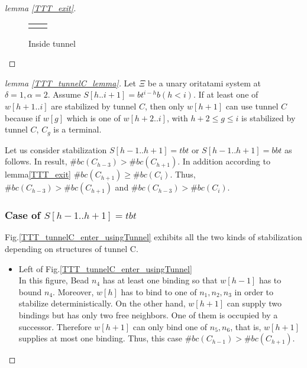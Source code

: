 \documentclass[runningheads]{llncs}
\begin{document}
\begin{proof}[lemma \ref{TTT_exit}]
\begin{figure}
\begin{tabular}{cc}
\begin{minipage}{0.33\hsize}
    \caption{Inside tunnel}
    \label{TTT_inside_tunnel}
    \end{minipage}
 
    \end{tabular}
\end{figure}
\end{proof}

\begin{proof}[lemma \ref{TTT_tunnelC_lemma}]
Let $\Xi$ be a unary oritatami system at $\delta = 1, \alpha = 2$.
Assume $S[h..i+1] = bt^{i-h}b (h<i)$. If at least one of $w[h+1..i]$ are stabilized by tunnel $C$, then only $w[h+1]$ can use tunnel $C$ because if $w[g]$ which is one of $w[h+2..i]$, with $h+2 \leq g \leq i$ is stabilized by tunnel $C$, $C_g$ is a terminal.


Let us consider stabilization $S[h-1..h+1] = tbt$ or $S[h-1..h+1] = bbt$ as follows. In result, $\#bc(C_{h-3}) > \#bc(C_{h+1})$. In addition according to lemma\ref{TTT_exit} $\#bc(C_{h+1}) \geq \#bc(C_{i})$. Thus, $\#bc(C_{h-3}) > \#bc(C_{h+1})$ and $\#bc(C_{h-3}) > \#bc(C_{i})$.
\\

\subsubsection{Case of $S[h-1..h+1] = tbt$}
Fig.\ref{TTT_tunnelC_enter_usingTunnel} exhibits all the two kinds of stabilization depending on structures of tunnel C.

\begin{itemize}
\item{Left of Fig.\ref{TTT_tunnelC_enter_usingTunnel}}\\
  In this figure, Bead $n_4$ has at least one binding so that $w[h-1]$ has to bound $n_4$. Moreover, $w[h]$ has to bind to one of $n_1, n_2, n_3$ in order to stabilize deterministically. On the other hand, $w[h+1]$ can supply two bindings but has only two free neighbors. One of them is occupied by a successor. Therefore $w[h+1]$ can only bind one of $n_5, n_6$, that is, $w[h+1]$ supplies at most one binding. Thus, this case $\#bc(C_{h-1}) > \#bc(C_{h+1})$.


\end{itemize}
\end{proof}
\end{document}
